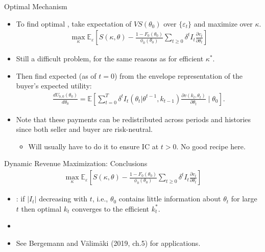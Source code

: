 \documentclass[english,10pt
,aspectratio=169
]{beamer}
\begin{document}
\begin{frame}{Optimal Mechanism}
\begin{itemize}
	\item To find optimal , take expectation of $VS(\theta_0)$ over $\{\varepsilon_t\}$ and maximize over $\kappa$.
	\vspace{-0.5em}\begin{align*}
		\max_\kappa \mathbb{E}_\varepsilon \left[ S(\kappa,\theta) - \frac{1-F_0(\theta_0)}{\phi_0(\theta_0)} \sum_{t\geq 0} \delta^t I_t \frac{\partial v_t}{\partial \theta_t} \right]
	\end{align*}\vspace{-1em}

	\item Still a difficult problem, for the same reasons as for efficient $\kappa^*$.
	\item Then find expected (as of $t=0$)  from the envelope representation of the buyer's expected utility:
	\vspace{-0.5em}\begin{align*}
		\frac{d U_{b,0} (\theta_0)}{d \theta_0} = \mathbb{E} \left[ \sum_{t=0}^{T} \delta^t I_t(\theta_t | \theta^{t-1}, k_{t-1})\frac{\partial v(k_t,\theta_t)}{\partial \theta_t} \mid \theta_0 \right].
	\end{align*}\vspace{-1em}

	\item Note that these payments can be redistributed across periods and histories since both seller and buyer are risk-neutral.
	\begin{itemize}
		\item Will usually have to do it to ensure IC at $t > 0$. No good recipe here.
	\end{itemize}
\end{itemize}
\end{frame}



\begin{frame}{Dynamic Revenue Maximization: Conclusions}
\begin{align*}
	\max_\kappa \mathbb{E}_\varepsilon \left[ S(\kappa,\theta) - \frac{1-F_0(\theta_0)}{\phi_0(\theta_0)} \sum_{t\geq 0} \delta^t I_t \frac{\partial v_t}{\partial \theta_t} \right]
\end{align*}
\begin{itemize}
	\item {}: if $|I_t|$ decreasing with $t$, i.e., $\theta_0$ contains little information about $\theta_t$ for large $t$ then optimal $k_t$ converges to the efficient $k^*_t$.
	\item {}
	\item See Bergemann and Välimäki (2019, ch.5) for applications.
\end{itemize}
\end{frame}
\end{document}
